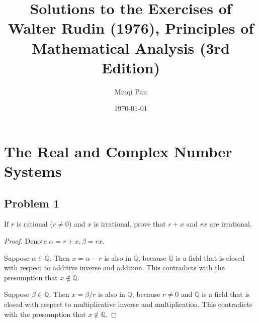 \documentclass{amsbook}
\theoremstyle{definition}
\theoremstyle{remark}
\numberwithin{section}{chapter}
\numberwithin{equation}{chapter}
\begin{document}
\frontmatter

\title{Solutions to the Exercises of Walter Rudin (1976), Principles of Mathematical Analysis (3rd Edition)}

\author{Minqi Pan}

\date{\today}

\maketitle

\setcounter{page}{4}

\tableofcontents

\mainmatter

\chapter{The Real and Complex Number Systems}

\section{Problem 1}

If $r$ is rational ($r\ne 0$) and $x$ is irrational, prove that $r+x$ and $rx$ are irrational.

\begin{proof}
Denote $\alpha=r+x, \beta=rx$.

Suppose $\alpha\in\mathbb{Q}$. Then $x=\alpha-r$ is also in $\mathbb{Q}$, because $\mathbb{Q}$ is a field that is closed with respect to additive inverse and addition. This contradicts with the presumption that $x\notin\mathbb{Q}$.

Suppose $\beta\in\mathbb{Q}$. Then $x=\beta/r$ is also in $\mathbb{Q}$, because $r\ne 0$ and $\mathbb{Q}$ is a field that is closed with respect to multiplicative inverse and multiplication. This contradicts with the presumption that $x\notin\mathbb{Q}$.

\end{proof}
\end{document}
